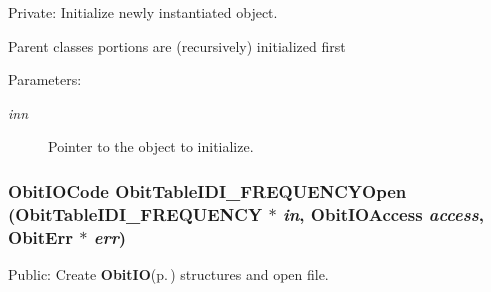 Private: Initialize newly instantiated object. 

Parent classes portions are (recursively) initialized first \begin{Desc}
\item[Parameters:]
\begin{description}
\item[{\em inn}]Pointer to the object to initialize. \end{description}
\end{Desc}
\subsubsection{\setlength{\rightskip}{0pt plus 5cm}Obit\-IOCode Obit\-Table\-IDI\_\-FREQUENCYOpen ({\bf Obit\-Table\-IDI\_\-FREQUENCY} $\ast$ {\em in}, Obit\-IOAccess {\em access}, {\bf Obit\-Err} $\ast$ {\em err})}\label{ObitTableIDI__FREQUENCY_8c_a21}


Public: Create {\bf Obit\-IO}{\rm (p.\,\pageref{structObitIO})} structures and open file. 

